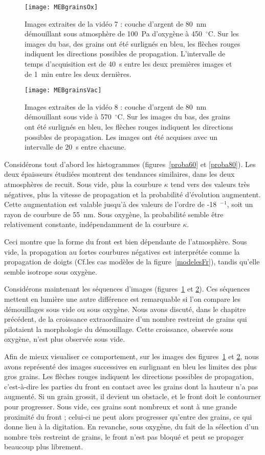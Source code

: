{{\begin{figure}[!p]
\centering
\texttt{[image: MEBgrainsOx]}
\caption{Images extraites de la vidéo 7 : couche d’argent de 80~nm démouillant sous atmosphère de 100~Pa d’oxygène à 450~$^\circ$C. Sur les images du bas, des grains ont été surlignés en bleu, les flèches rouges indiquent les directions possibles de propagation. L'intervalle de temps d'acquisition est de 40~s entre les deux premières images et de 1~min entre les deux dernières.}
\label{MEBgrainsOx}
\end{figure}
\begin{figure}[!p]
\centering
\texttt{[image: MEBgrainsVac]}
\caption{Images extraites de la vidéo 8 : couche d’argent de 80~nm démouillant sous vide à 570~$^\circ$C. Sur les images du bas, des grains ont été surlignés en bleu, les flèches rouges indiquent les directions possibles de propagation. Les images ont été acquises avec un intervalle de 20~s entre chacune.}
\label{MEBgrainsVac}
\end{figure}
Considérons tout d'abord les histogrammes (figures~\ref{proba60} et \ref{proba80}). Les deux épaisseurs étudiées montrent des tendances similaires, dans les deux atmosphères de recuit. Sous vide, plus la courbure $\kappa$ tend vers des valeurs très négatives, plus la vitesse de propagation et la probabilité d’évolution augmentent. Cette augmentation est valable jusqu’à des valeurs de l’ordre de -18~\micro\meter$^{-1}$, soit un rayon de courbure de 55~nm. Sous oxygène, la probabilité semble être relativement constante, indépendamment de la courbure $\kappa$.\par 
Ceci montre que la forme du front est bien dépendante de l’atmosphère. Sous vide, la propagation au fortes courbures négatives est interprétée comme la propagation de doigts (Cf.les cas modèles de la figure~\ref{modelesFr}), tandis qu’elle semble isotrope sous oxygène.\par 
Considérons maintenant les séquences d'images (figures~\ref{MEBgrainsOx} et \ref{MEBgrainsVac}). Ces séquences mettent en lumière une autre différence est remarquable si l’on compare les démouillages sous vide ou sous oxygène. Nous avons discuté, dans le chapitre précédent, de la croissance extraordinaire d’un nombre restreint de grains qui pilotaient la morphologie du démouillage. Cette croissance, observée sous oxygène, n’est plus observée sous vide.\par
Afin de mieux visualiser ce comportement, sur les images des figures~\ref{MEBgrainsOx} et \ref{MEBgrainsVac}, nous avons représenté des images successives en surlignant en bleu les limites des plus gros grains. Les flèches rouges indiquent les directions possibles de propagation, c’est-à-dire les parties du front en contact avec les grains dont la hauteur n’a pas augmenté. Si un grain grossit, il devient un obstacle, et le front doit le contourner pour progresser. Sous vide, ces grains sont nombreux et sont à une grande proximité du front ; celui-ci ne peut alors progresser qu’entre des grains, ce qui donne lieu à la digitation. En revanche, sous oxygène, du fait de la sélection d’un nombre très restreint de grains, le front n’est pas bloqué et peut se propager beaucoup plus librement.\par 
}}
